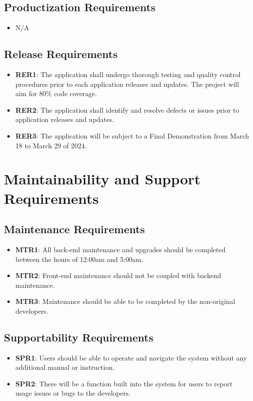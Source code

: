 \documentclass[12pt]{article}
\begin{document}
\subsection{Productization Requirements}
\begin{itemize}
    \item N/A
\end{itemize}
\subsection{Release Requirements}
\begin{itemize}
   \item \textbf{RER1}: The application shall undergo thorough testing and quality control procedures prior to each application releases and updates. The project will aim for 80\% code coverage.
    \item \textbf{RER2}: The application shall identify and resolve defects or issues prior to application releases and updates.
    \item \textbf{RER3}: The application will be subject to a Final Demonstration from March 18 to March 29 of 2024.
\end{itemize}

\section{Maintainability and Support Requirements}
\subsection{Maintenance Requirements}
\begin{itemize}
  \item \textbf{MTR1}: All back-end maintenance and upgrades should be completed between the hours of 12:00am and 5:00am.
  \item \textbf{MTR2}: Front-end maintenance should not be coupled with backend maintenance.
  \item \textbf{MTR3}: Maintenance should be able to be completed by the non-original developers.
\end{itemize}
\subsection{Supportability Requirements}
\begin{itemize}
  \item \textbf{SPR1}: Users should be able to operate and navigate the system without any additional manual or instruction.
  \item \textbf{SPR2}: There will be a function built into the system for users to report usage issues or bugs to the developers.
\end{itemize}
\end{document}

